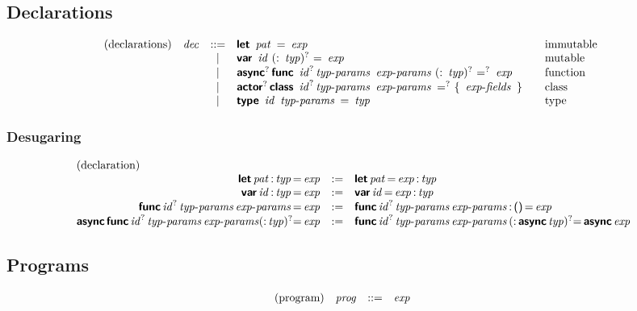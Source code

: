 \subsection*{Declarations}

$$
\begin{array}{@{}lrcl@{\qquad}l}
\text{(declarations)} & \x{dec} &::=&
  \KK{let}~\x{pat}~\K=~\x{exp}
    & \text{immutable} \\&&|&
  \KK{var}~\x{id}~(\K:~\x{typ})^?~\K=~\x{exp}
    & \text{mutable} \\&&|&
  \KK{async}^?\, \KK{func}~\x{id}^? \x{typ-params}~\x{exp-params}~(\K:~\x{typ})^?~\K=^?~\x{exp}
    & \text{function} \\&&|&
  \KK{actor}^?\, \KK{class}~\x{id}^? \x{typ-params}~\x{exp-params}~\K=^?~\K\{~\x{exp-fields}~\K\}
    & \text{class} \\&&|&
  \KK{type}~\x{id}~\x{typ-params}~\K=~\x{typ}
    & \text{type} \\
\end{array}
$$

\subsubsection*{Desugaring}

$$
\begin{array}{@{}rcl@{}}
\text{(declaration)} \hfill \\
\KK{let} \x{pat} \K: \x{typ} \K= \x{exp} &:=&
  \KK{let} \x{pat} \K= \x{exp} \K: \x{typ} \\
\KK{var} \x{id} \K: \x{typ} \K= \x{exp} &:=&
  \KK{var} \x{id} \K= \x{exp} \K: \x{typ} \\
\KK{func} \x{id}^? \x{typ-params} \x{exp-params} \K= \x{exp} &:=&
  \KK{func} \x{id}^? \x{typ-params} \x{exp-params} \K: \, \K{()} \, \K= \x{exp} \\
\KK{async} \, \KK{func} \x{id}^? \x{typ-params} \x{exp-params} (\K: \x{typ})^? \K= \x{exp} &:=&
\KK{func} \x{id}^? \x{typ-params} \x{exp-params} \, (\K: \, \KK{async} \x{typ})^? \K= \, \KK{async} \x{exp} \\
\end{array}
$$


\subsection*{Programs}

$$
\begin{array}{@{}lrcl@{\qquad}l}
\text{(program)} & \x{prog} &::=&
  \x{exp}
\end{array}
$$

